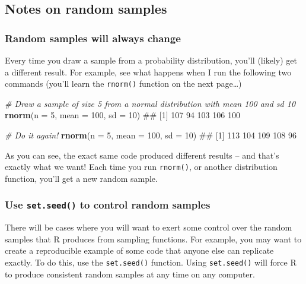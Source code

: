 \documentclass[]{book}
\newenvironment{Shaded}{\begin{snugshade}}{\end{snugshade}}
\newcommand{\KeywordTok}[1]{\textcolor[rgb]{0.13,0.29,0.53}{\textbf{#1}}}
\newcommand{\DataTypeTok}[1]{\textcolor[rgb]{0.13,0.29,0.53}{#1}}
\newcommand{\DecValTok}[1]{\textcolor[rgb]{0.00,0.00,0.81}{#1}}
\newcommand{\CommentTok}[1]{\textcolor[rgb]{0.56,0.35,0.01}{\textit{#1}}}
\newcommand{\NormalTok}[1]{#1}
\theoremstyle{definition}
\theoremstyle{definition}
\theoremstyle{remark}
\begin{document}
\subsection{Notes on random samples}\label{notes-on-random-samples}

\subsubsection{Random samples will always
change}\label{random-samples-will-always-change}

Every time you draw a sample from a probability distribution, you'll
(likely) get a different result. For example, see what happens when I
run the following two commands (you'll learn the \texttt{rnorm()}
function on the next page\ldots{})

\begin{Shaded}
\begin{Highlighting}[]
\CommentTok{# Draw a sample of size 5 from a normal distribution with mean 100 and sd 10}
\KeywordTok{rnorm}\NormalTok{(}\DataTypeTok{n =} \DecValTok{5}\NormalTok{, }\DataTypeTok{mean =} \DecValTok{100}\NormalTok{, }\DataTypeTok{sd =} \DecValTok{10}\NormalTok{)}
\NormalTok{## [1] 107  94 103 106 100}

\CommentTok{# Do it again!}
\KeywordTok{rnorm}\NormalTok{(}\DataTypeTok{n =} \DecValTok{5}\NormalTok{, }\DataTypeTok{mean =} \DecValTok{100}\NormalTok{, }\DataTypeTok{sd =} \DecValTok{10}\NormalTok{)}
\NormalTok{## [1] 113 104 109 108  96}
\end{Highlighting}
\end{Shaded}

As you can see, the exact same code produced different results -- and
that's exactly what we want! Each time you run \texttt{rnorm()}, or
another distribution function, you'll get a new random sample.

\subsubsection{\texorpdfstring{Use \texttt{set.seed()} to control random
samples}{Use set.seed() to control random samples}}\label{use-set.seed-to-control-random-samples}

There will be cases where you will want to exert some control over the
random samples that R produces from sampling functions. For example, you
may want to create a reproducible example of some code that anyone else
can replicate exactly. To do this, use the \texttt{set.seed()} function.
Using \texttt{set.seed()} will force R to produce consistent random
samples at any time on any computer.
\end{document}

